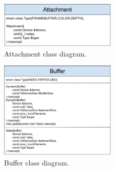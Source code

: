 \documentclass[12pt]{report}
\newcommand{\figurewidth}{0.6\textwidth}
\newcommand{\imagewidth}{0.5\textwidth}
\theoremstyle{definition}
\begin{document}
  \begin{figure}
    \centering
    \includegraphics[width=\imagewidth]{images/class_attachment.png}
    \caption{Attachment class diagram.}
    \label{fig:class_attachment}  
  \end{figure}

  \lipsum[3]

  \begin{figure}
    \centering
    \includegraphics[width=\imagewidth]{images/class_buffer.png}
    \caption{Buffer class diagram.}
    \label{fig:class_buffer}  
  \end{figure}
\end{document}
